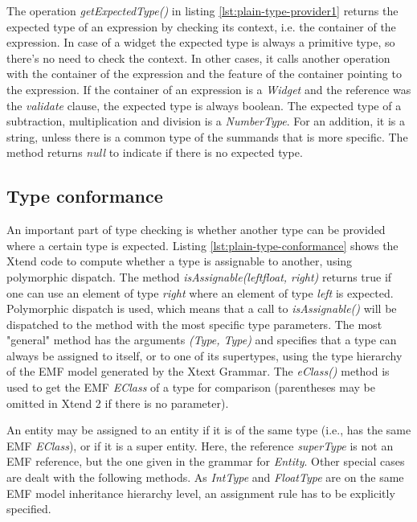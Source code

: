 

The operation \emph{getExpectedType()} in listing \ref{lst:plain-type-provider1} returns the expected type of an expression by checking its context, i.e. the container of the expression. In case of a widget the expected type is always a primitive type, so there's no need to check the context. In other cases, it calls another operation with the container of the expression and the feature of the container pointing to the expression. If the container of an expression is a \emph{Widget} and the reference was the \emph{validate} clause, the expected type is always boolean. The expected type of a subtraction, multiplication and division is a \emph{NumberType}. For an addition, it is a string, unless there is a common type of the summands that is more specific. The method returns \emph{null} to indicate if there is no expected type.

%

\subsection{Type conformance}
An important part of type checking is whether another type can be provided where a certain type is expected.
Listing \ref{lst:plain-type-conformance} shows the Xtend code to compute whether a type is assignable to another, using polymorphic dispatch. The method \emph{isAssignable(leftfloat, right)} returns true if one can use an element of type \emph{right} where an element of type \emph{left} is expected. Polymorphic dispatch is used, which means that a call to \emph{isAssignable()} will be dispatched to the method with the most specific type parameters. The most "general" method has the arguments \emph{(Type, Type)} and specifies that a type can always be assigned to itself, or to one of its supertypes, using the type hierarchy of the EMF model generated by the Xtext Grammar. The \emph{eClass()} method is used to get the EMF \emph{EClass} of a type for comparison (parentheses may be omitted in Xtend 2 if there is no parameter).

An entity may be assigned to an entity if it is of the same type (i.e., has the same EMF \emph{EClass}), or if it is a super entity. Here, the reference \emph{superType} is not an EMF reference, but the one given in the grammar for \emph{Entity}. Other special cases are dealt with the following methods. As \emph{IntType} and \emph{FloatType} are on the same EMF model inheritance hierarchy level, an assignment rule has to be explicitly specified.

